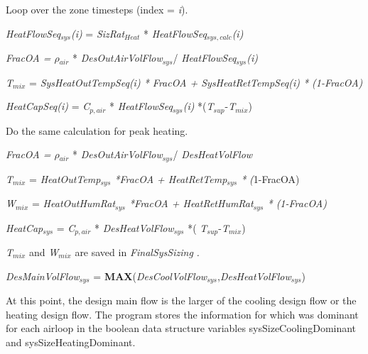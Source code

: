 \begin{enumerate}
\def\labelenumi{(\roman{enumi})}
\setcounter{enumi}{4}
\tightlist
{\setlength\itemindent{25pt} \item Loop over the zone timesteps (index = \emph{i}).}
\end{enumerate}

\emph{HeatFlowSeq\(_{sys}\)(i)} = \emph{SizRat\(_{Heat}\)} * \emph{HeatFlowSeq\(_{sys,calc}\)(i)}

\emph{FracOA = $\rho$\(_{air}\)} * \emph{DesOutAirVolFlow\(_{sys}\)}/ \emph{HeatFlowSeq\(_{sys}\)(i)}

\emph{T\(_{mix}\)} = \emph{SysHeatOutTempSeq(i) * FracOA + SysHeatRetTempSeq(i) * (1-FracOA)}

\emph{HeatCapSeq(i)} = \emph{C\(_{p,air}\)} * \emph{HeatFlowSeq\(_{sys}\)(i)} *(\emph{T\(_{sup}\)}-\emph{T\(_{mix}\)})

\begin{enumerate}
\def\labelenumi{(\roman{enumi})}
\setcounter{enumi}{5}
\tightlist
{\setlength\itemindent{25pt} \item Do the same calculation for peak heating.}
\end{enumerate}

\emph{FracOA = $\rho$\(_{air}\)} * \emph{DesOutAirVolFlow\(_{sys}\)}/ \emph{DesHeatVolFlow}

\emph{T\(_{mix}\)} = \emph{HeatOutTemp\(_{sys}\) *FracOA + HeatRetTemp\(_{sys}\) *} \emph{(}1-FracOA)

\emph{W\(_{mix}\)} = \emph{HeatOutHumRat\(_{sys}\) *FracOA + HeatRetHumRat\(_{sys}\) * (1-FracOA)}

\emph{HeatCap\(_{sys}\)} = \emph{C\(_{p,air}\)} * \emph{DesHeatVolFlow\(_{sys}\)} *( \emph{T\(_{sup}\)}-\emph{T\(_{mix}\)})

\emph{T\(_{mix}\)} and \emph{W\(_{mix}\)} are saved in \emph{FinalSysSizing} \emph{.}

\begin{enumerate}
\def\labelenumi{(\roman{enumi})}
\setcounter{enumi}{6}
\tightlist
{\setlength\itemindent{25pt} \item \emph{DesMainVolFlow\(_{sys}\)} = \textbf{MAX}(\emph{DesCoolVolFlow\(_{sys}\)},\emph{DesHeatVolFlow\(_{sys}\)})}
\end{enumerate}

At this point, the design main flow is the larger of the cooling design flow or the heating design flow. The program stores the information for which was dominant for each airloop in the boolean data structure variables sysSizeCoolingDominant and sysSizeHeatingDominant. 

